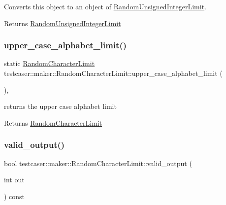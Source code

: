 Converts this object to an object of \hyperlink{classtestcaser_1_1maker_1_1RandomUnsignedIntegerLimit}{Random\+Unsigned\+Integer\+Limit}. 

\begin{DoxyReturn}{Returns}
\hyperlink{classtestcaser_1_1maker_1_1RandomUnsignedIntegerLimit}{Random\+Unsigned\+Integer\+Limit} 
\end{DoxyReturn}
\mbox{\label{classtestcaser_1_1maker_1_1RandomCharacterLimit_a7a0ee0690e97a27402faca09c6044aed}} 
\subsubsection{\texorpdfstring{upper\+\_\+case\+\_\+alphabet\+\_\+limit()}{upper\_case\_alphabet\_limit()}}
{\footnotesize\ttfamily static \hyperlink{classtestcaser_1_1maker_1_1RandomCharacterLimit}{Random\+Character\+Limit} testcaser\+::maker\+::\+Random\+Character\+Limit\+::upper\+\_\+case\+\_\+alphabet\+\_\+limit (\begin{DoxyParamCaption}{ }\end{DoxyParamCaption})\hspace{0.3cm}{\ttfamily [inline]}, {\ttfamily [static]}}



returns the upper case alphabet limit 

\begin{DoxyReturn}{Returns}
\hyperlink{classtestcaser_1_1maker_1_1RandomCharacterLimit}{Random\+Character\+Limit} 
\end{DoxyReturn}
\mbox{\label{classtestcaser_1_1maker_1_1RandomCharacterLimit_a1b3f0a14a18aa307cf4a82f834393928}} 
\subsubsection{\texorpdfstring{valid\+\_\+output()}{valid\_output()}}
{\footnotesize\ttfamily bool testcaser\+::maker\+::\+Random\+Character\+Limit\+::valid\+\_\+output (\begin{DoxyParamCaption}\item[{int}]{out }\end{DoxyParamCaption}) const\hspace{0.3cm}{\ttfamily [inline]}}



